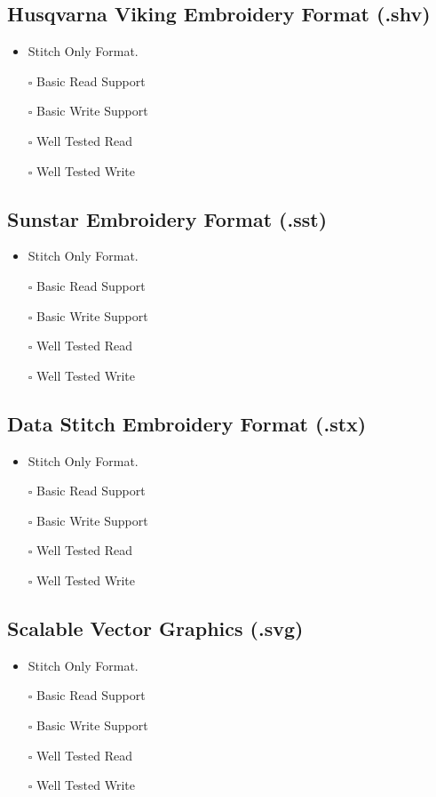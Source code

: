 \documentclass[onesize, a4paper]{refart}
\providecommand{\tightlist}{\setlength{\itemsep}{0pt}\setlength{\parskip}{0pt}}
\begin{document}
\subsection{Husqvarna Viking Embroidery Format (.shv)}

\begin{itemize}
\tightlist
\item Stitch Only Format.
\item[$\square$] Basic Read Support
\item[$\square$] Basic Write Support
\item[$\square$] Well Tested Read
\item[$\square$] Well Tested Write
\end{itemize}

\subsection{Sunstar Embroidery Format (.sst)}

\begin{itemize}
\tightlist
\item Stitch Only Format.
\item[$\square$] Basic Read Support
\item[$\square$] Basic Write Support
\item[$\square$] Well Tested Read
\item[$\square$] Well Tested Write
\end{itemize}

\subsection{Data Stitch Embroidery Format (.stx)}

\begin{itemize}
\tightlist
\item Stitch Only Format.
\item[$\square$] Basic Read Support
\item[$\square$] Basic Write Support
\item[$\square$] Well Tested Read
\item[$\square$] Well Tested Write
\end{itemize}

\subsection{Scalable Vector Graphics (.svg)}

\begin{itemize}
\tightlist
\item Stitch Only Format.
\item[$\square$] Basic Read Support
\item[$\square$] Basic Write Support
\item[$\square$] Well Tested Read
\item[$\square$] Well Tested Write
\end{itemize}
\end{document}
